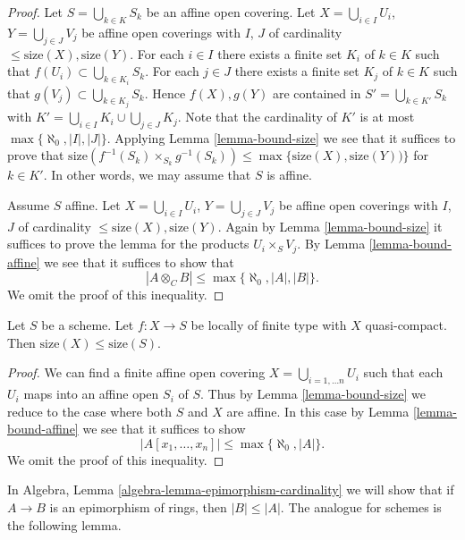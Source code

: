 \begin{proof}
Let $S = \bigcup_{k \in K} S_k$ be an affine open covering.
Let $X = \bigcup_{i \in I} U_i$, $Y = \bigcup_{j \in J} V_j$
be affine open coverings with $I$, $J$ of cardinality
$\leq \text{size}(X), \text{size}(Y)$.
For each $i \in I$ there exists a finite set $K_i$ of $k \in K$
such that $f(U_i) \subset \bigcup_{k \in K_i} S_k$.
For each $j \in J$ there exists a finite set $K_j$ of $k \in K$
such that $g(V_j) \subset \bigcup_{k \in K_j} S_k$.
Hence $f(X), g(Y)$ are contained in
$S' = \bigcup_{k \in K'} S_k$ with
$K' = \bigcup_{i \in I} K_i \cup \bigcup_{j \in J} K_j$.
Note that the cardinality of $K'$
is at most $\max\{\aleph_0, |I|, |J|\}$. Applying
Lemma \ref{lemma-bound-size}
we see that it suffices to prove that
$\text{size}(f^{-1}(S_k) \times_{S_k} g^{-1}(S_k))
\leq \max\{\text{size}(X), \text{size}(Y))\}$ for $k \in K'$.
In other words, we may assume that $S$ is affine.

\medskip\noindent
Assume $S$ affine.
Let $X = \bigcup_{i \in I} U_i$, $Y = \bigcup_{j \in J} V_j$
be affine open coverings with $I$, $J$ of cardinality
$\leq \text{size}(X), \text{size}(Y)$.
Again by
Lemma \ref{lemma-bound-size}
it suffices to prove the lemma for the products
$U_i \times_S V_j$. By
Lemma \ref{lemma-bound-affine}
we see that it suffices to show that
$$
|A \otimes_C B| \leq \max\{\aleph_0, |A|, |B|\}.
$$
We omit the proof of this inequality.
\end{proof}

\begin{lemma}
\label{lemma-bound-finite-type}
Let $S$ be a scheme.
Let $f : X \to S$ be locally of finite type with $X$ quasi-compact.
Then $\text{size}(X) \leq \text{size}(S)$.
\end{lemma}

\begin{proof}
We can find a finite affine open covering $X = \bigcup_{i = 1, \ldots n} U_i$
such that each $U_i$ maps into an affine open $S_i$ of $S$. Thus by
Lemma \ref{lemma-bound-size}
we reduce to the case where both $S$ and $X$ are affine. In this case by
Lemma \ref{lemma-bound-affine}
we see that it suffices to show
$$
|A[x_1, \ldots, x_n]| \leq \max\{\aleph_0, |A|\}.
$$
We omit the proof of this inequality.
\end{proof}

\noindent
In
Algebra, Lemma \ref{algebra-lemma-epimorphism-cardinality}
we will show that if $A \to B$ is an epimorphism of rings, then
$|B| \leq |A|$. The analogue for schemes is the following lemma.

